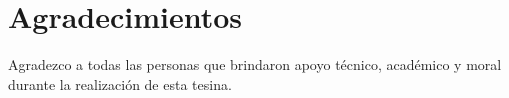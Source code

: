 \chapter*{Agradecimientos}
Agradezco a todas las personas que brindaron apoyo técnico, académico y moral durante la realización de esta tesina.
